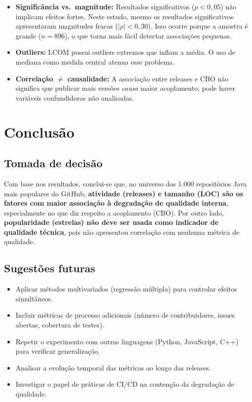 \documentclass[12pt,a4paper]{article}
\begin{document}
\begin{itemize}
    \item \textbf{Significância vs.\ magnitude:} Resultados significativos ($p < 0{,}05$) não implicam efeitos fortes. Neste estudo, mesmo os resultados significativos apresentaram magnitudes fracas ($|\rho| < 0{,}30$). Isso ocorre porque a amostra é grande ($n = 896$), o que torna mais fácil detectar associações pequenas.
    \item \textbf{Outliers:} LCOM possui outliers extremos que inflam a média. O uso de mediana como medida central atenua esse problema.
    \item \textbf{Correlação $\neq$ causalidade:} A associação entre releases e CBO não significa que publicar mais versões \textit{causa} maior acoplamento; pode haver variáveis confundidoras não analisadas.
\end{itemize}

\newpage

\section{Conclusão}

\subsection{Tomada de decisão}

Com base nos resultados, conclui-se que, no universo dos 1.000 repositórios Java mais populares do GitHub, \textbf{atividade (releases) e tamanho (LOC) são os fatores com maior associação à degradação de qualidade interna}, especialmente no que diz respeito a acoplamento (CBO). Por outro lado, \textbf{popularidade (estrelas) não deve ser usada como indicador de qualidade técnica}, pois não apresentou correlação com nenhuma métrica de qualidade.

\subsection{Sugestões futuras}

\begin{itemize}
    \item Aplicar métodos multivariados (regressão múltipla) para controlar efeitos simultâneos.
    \item Incluir métricas de processo adicionais (número de contribuidores, issues abertas, cobertura de testes).
    \item Repetir o experimento com outras linguagens (Python, JavaScript, C++) para verificar generalização.
    \item Analisar a evolução temporal das métricas ao longo das releases.
    \item Investigar o papel de práticas de CI/CD na contenção da degradação de qualidade.
\end{itemize}
\end{document}
